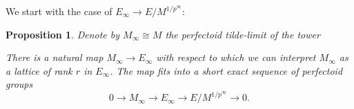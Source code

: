 \documentclass[10pt,oneside]{amsart}
\newtheorem{proposition}[theorem]{Proposition}
\theoremstyle{definition}
\begin{document}
	We start with the case of $E_\infty\rightarrow E/M^{1/p^\infty}$:
	\begin{proposition}\label{the morphism E->E/M^{1/p^n} in the limit}
		Denote by $M_\infty\cong M$ the perfectoid tilde-limit of the tower
		\begin{center}
		\end{center}
		There is a natural map $M_\infty \rightarrow E_\infty$ with respect to which we can interpret $M_\infty$ as a lattice of rank $r$ in $E_\infty$. The map fits into a short exact sequence of perfectoid groups
		\[0\rightarrow M_\infty\rightarrow E_\infty \rightarrow E/M^{1/p^\infty} \rightarrow 0.\]
	\end{proposition}
\end{document}
